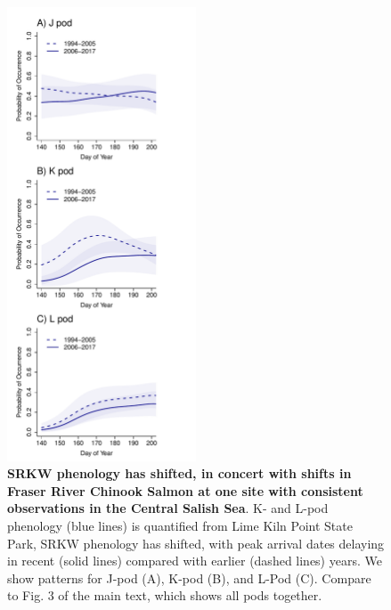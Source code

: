 \documentclass{article}
\begin{document}
\newpage
\begin{figure}[p]
\includegraphics[width=0.5\textwidth]{../analyses/orcaphen/figures/orcachinphenoverlap_allpods2006.pdf}
\caption{\textbf{SRKW phenology has shifted, in concert with shifts in Fraser River Chinook Salmon at one site with consistent observations in the Central Salish Sea}. K- and L-pod phenology (blue lines) is quantified from Lime Kiln Point State Park, SRKW phenology has shifted, with peak arrival dates delaying in recent (solid lines) compared with earlier (dashed lines) years. We show patterns for J-pod (A), K-pod (B), and L-Pod (C). Compare to Fig. 3 of the main text, which shows all pods together. }
\label{fig:KLchin}
\end{figure}
\end{document}
